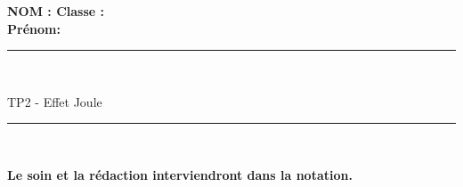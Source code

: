 \documentclass[11pt,a4paper]{article}
\begin{document}
\flushleft \textbf{NOM : \hfill Classe : \hspace{3cm} ~~\\[2mm]
Prénom:\\[0,4cm]
}
\hrule\
\\[0,2cm]

\begin{center}
 \LARGE{TP2 - Effet Joule}
\end{center}

\vspace{3 mm}

\normalsize

\hrule\
\\[0,2cm]
   \begin{center}
   \textbf{Le soin et la rédaction interviendront dans la notation.}
   \end{center} 

\vfill 



  \\
\end{document}
